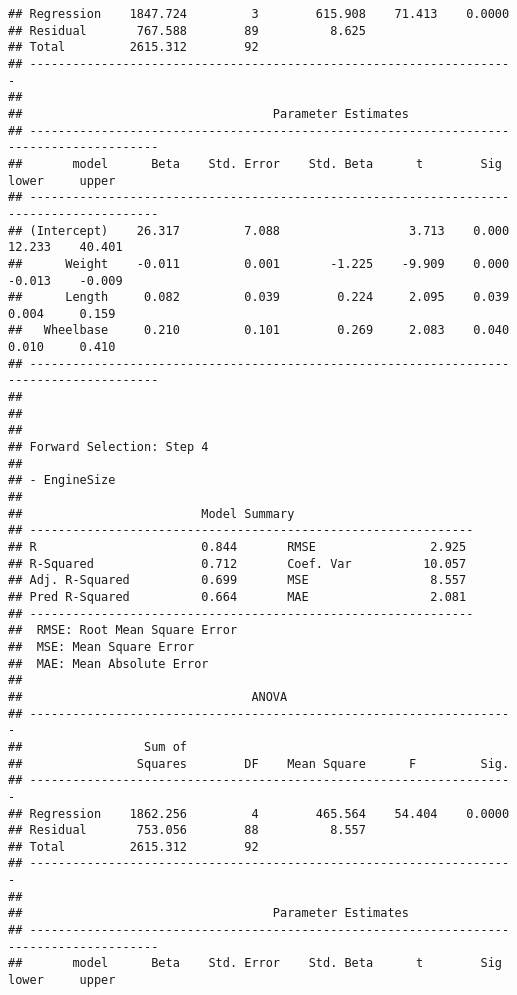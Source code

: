 \documentclass[
]{book}
\begin{document}
\begin{verbatim}
## Regression    1847.724         3        615.908    71.413    0.0000 
## Residual       767.588        89          8.625                     
## Total         2615.312        92                                    
## --------------------------------------------------------------------
## 
##                                   Parameter Estimates                                    
## ----------------------------------------------------------------------------------------
##       model      Beta    Std. Error    Std. Beta      t        Sig      lower     upper 
## ----------------------------------------------------------------------------------------
## (Intercept)    26.317         7.088                  3.713    0.000    12.233    40.401 
##      Weight    -0.011         0.001       -1.225    -9.909    0.000    -0.013    -0.009 
##      Length     0.082         0.039        0.224     2.095    0.039     0.004     0.159 
##   Wheelbase     0.210         0.101        0.269     2.083    0.040     0.010     0.410 
## ----------------------------------------------------------------------------------------
## 
## 
## 
## Forward Selection: Step 4 
## 
## - EngineSize 
## 
##                         Model Summary                          
## --------------------------------------------------------------
## R                       0.844       RMSE                2.925 
## R-Squared               0.712       Coef. Var          10.057 
## Adj. R-Squared          0.699       MSE                 8.557 
## Pred R-Squared          0.664       MAE                 2.081 
## --------------------------------------------------------------
##  RMSE: Root Mean Square Error 
##  MSE: Mean Square Error 
##  MAE: Mean Absolute Error 
## 
##                                ANOVA                                 
## --------------------------------------------------------------------
##                 Sum of                                              
##                Squares        DF    Mean Square      F         Sig. 
## --------------------------------------------------------------------
## Regression    1862.256         4        465.564    54.404    0.0000 
## Residual       753.056        88          8.557                     
## Total         2615.312        92                                    
## --------------------------------------------------------------------
## 
##                                   Parameter Estimates                                    
## ----------------------------------------------------------------------------------------
##       model      Beta    Std. Error    Std. Beta      t        Sig      lower     upper 

\end{verbatim}
\end{document}
